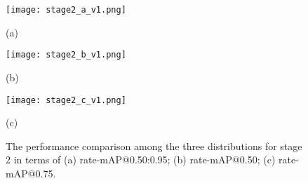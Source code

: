 \documentclass[transmag]{IEEEtran}
\begin{document}
\begin{figure*}[t]
\begin{minipage}[b]{0.3\linewidth}
  \centering
  \centerline{\texttt{[image: stage2\_a\_v1.png]}}
  \centerline{(a)}\medskip
\end{minipage}
\hfill
\begin{minipage}[b]{0.3\linewidth}
  \centering
  \centerline{\texttt{[image: stage2\_b\_v1.png]}}
  \centerline{(b)}\medskip
\end{minipage}
\hfill
\begin{minipage}[b]{0.3\linewidth}
  \centering
  \centerline{\texttt{[image: stage2\_c\_v1.png]}}
  \centerline{(c)}\medskip
\end{minipage}
\vspace{-4mm}
\caption{The performance comparison among the three distributions for stage 2 in terms of (a) rate-mAP@0.50:0.95; (b) rate-mAP@0.50; (c) rate-mAP@0.75.}
\vspace{-2mm}
\label{stage2}
\end{figure*}
\end{document}
